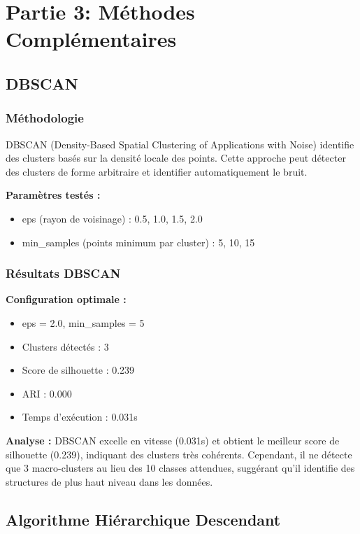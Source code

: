 \documentclass[12pt,a4paper]{article}
\begin{document}
\section{Partie 3: Méthodes Complémentaires}

\subsection{DBSCAN}

\subsubsection{Méthodologie}

DBSCAN (Density-Based Spatial Clustering of Applications with Noise) identifie des clusters basés sur la densité locale des points. Cette approche peut détecter des clusters de forme arbitraire et identifier automatiquement le bruit.

\textbf{Paramètres testés :}
\begin{itemize}
    \item eps (rayon de voisinage) : 0.5, 1.0, 1.5, 2.0
    \item min\_samples (points minimum par cluster) : 5, 10, 15
\end{itemize}

\subsubsection{Résultats DBSCAN}

\textbf{Configuration optimale :}
\begin{itemize}
    \item eps = 2.0, min\_samples = 5
    \item Clusters détectés : 3
    \item Score de silhouette : 0.239
    \item ARI : 0.000
    \item Temps d'exécution : 0.031s
\end{itemize}

\textbf{Analyse :} DBSCAN excelle en vitesse (0.031s) et obtient le meilleur score de silhouette (0.239), indiquant des clusters très cohérents. Cependant, il ne détecte que 3 macro-clusters au lieu des 10 classes attendues, suggérant qu'il identifie des structures de plus haut niveau dans les données.

\subsection{Algorithme Hiérarchique Descendant}
\end{document}
